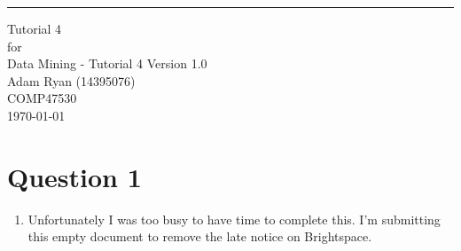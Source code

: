 \documentclass{scrreprt}
\date{}
\def\myversion{1.0}
\begin{document}
	
	\begin{flushright}
		\rule{16cm}{5pt}\vskip1cm
		\begin{bfseries}
			\Huge{Tutorial 4\\}
			\vspace{1.9cm}
			for\\
			\vspace{1.9cm}
			Data Mining - Tutorial 4
			\vspace{1.9cm}
			\LARGE{Version \myversion}\\
			\vspace{1.9cm}
			Adam Ryan (14395076)\\
			\vspace{1.9cm}
			COMP47530\\
			\vspace{1.9cm}
			\today\\
		\end{bfseries}
	\end{flushright}
	
	\tableofcontents

	
\chapter{Question 1}
\begin{enumerate}
	\item Unfortunately I was too busy to have time to complete this. I'm submitting this empty document to remove the late notice on Brightspace.
\end{enumerate}
	
\end{document}
